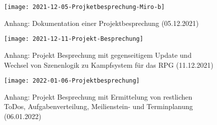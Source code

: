  
\begin{figure}[H]
    \centering
    \caption{Anhang: Dokumentation einer Projektbesprechung (05.12.2021)}
    \label{fig:2021-12-05-Projketbesprechung-Miro-b}
    \texttt{[image: 2021-12-05-Projketbesprechung-Miro-b]}
\end{figure}







\begin{figure}[H]
    \centering
    \caption{Anhang: Projekt Besprechung mit gegenseitigem Update und Wechsel von Szenenlogik zu Kampfsystem für das RPG (11.12.2021) }
    \label{fig:2021-12-11-Projekt-Besprechung}
    \texttt{[image: 2021-12-11-Projekt-Besprechung]}
\end{figure}


\begin{figure}[H]
    \centering
    \caption{Anhang: Projekt Besprechung mit Ermittelung von restlichen ToDos, Aufgabenverteilung, Meilienstein- und Terminplanung (06.01.2022)}
    \label{fig:2022-01-06-Projektbesprechung}
    \texttt{[image: 2022-01-06-Projektbesprechung]}
\end{figure}

